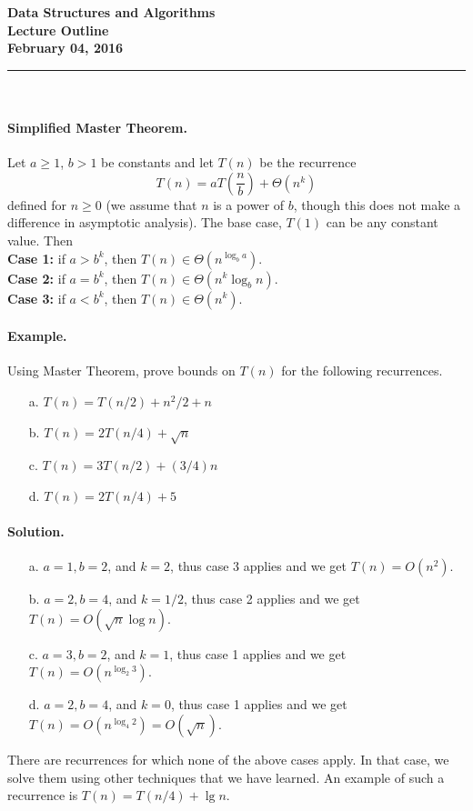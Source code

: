 \documentclass[11pt,twoside]{article}
\newcommand{\coursetitle}{Data Structures and Algorithms}
\newcommand{\docdate}{February 04, 2016}
\newcommand{\duedate}{February 04, 2016}
\newcommand{\doctitle}{Lecture Outline}
\newcommand{\student}{PUT YOUR NAME HERE}
\def\ni{\noindent}
\begin{document}
\thispagestyle{empty}

\begin{center}
\Large\bf\coursetitle\\[2pt]\doctitle\\ \large\docdate
\end{center}
\vspace*{0.10in}

\hrule
~\\

\ni
\paragraph{Simplified Master Theorem.} Let $a\geq 1$, $b>1$ be
constants and let $T(n)$ be the recurrence 
\[
T(n) = aT\left (\frac{n}{b} \right ) + \Theta(n^k) 
\]
defined for $n\geq 0$ (we assume that $n$ is a power of $b$, though
this does not make a difference in asymptotic analysis). The base
case, $T(1)$ can be any constant value. Then \\
\textbf{Case 1: } if $a > b^k$, then $T(n)\in \Theta(n^{\log_b a})$.\\
\textbf{Case 2: } if $a = b^k$, then $T(n)\in \Theta(n^k\log_b n)$.\\
\textbf{Case 3: } if $a < b^k$, then $T(n)\in \Theta(n^k)$.

\paragraph{Example.} Using Master Theorem, prove bounds on $T(n)$ for
the following recurrences.
\begin{enumerate}
\item[a.] $T(n) = T(n/2) + n^2/2 + n$
\item[b.] $T(n) = 2T(n/4) + \sqrt{n}$
\item[c.] $T(n) = 3T(n/2) + (3/4)n$
\item[d.] $T(n) = 2T(n/4) + 5$
\end{enumerate}

\paragraph{Solution.} 
\begin{enumerate}
\item[a.] $a=1, b=2$, and $k=2$, thus case 3 applies and we get $T(n)
  = O(n^2)$.
\item[b.] $a=2, b=4$, and $k=1/2$, thus case 2 applies and we get $T(n)
  = O(\sqrt{n}\log n)$.
\item[c.] $a=3, b=2$, and $k=1$, thus case 1 applies and we get $T(n)
  = O(n^{\log_2 3})$.
\item[d.] $a=2, b=4$, and $k=0$, thus case 1 applies and we get $T(n)
  = O(n^{\log_4 2}) = O(\sqrt{n})$.
\end{enumerate}
There are recurrences for which none of the above cases apply. In that
case, we solve them using other techniques that we have learned. An
example of such a recurrence is $T(n) = T(n/4) + \lg n$.
\end{document}
